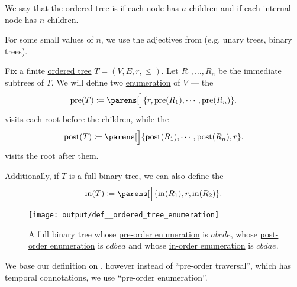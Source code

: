 \begin{definition}\label{def:n_ary_tree}
  We say that the \hyperref[def:ordered_tree]{ordered tree} is  if each node has  \( n \) children and  if each internal node has  \( n \) children.

  For some small values of \( n \), we use the adjectives from  (e.g. unary trees, binary trees).
\end{definition}

\begin{definition}\label{def:ordered_tree_enumeration}\mimprovised
  Fix a finite \hyperref[def:ordered_tree]{ordered tree} \( T = (V, E, r, \leq) \). Let \( R_1, \ldots, R_n \) be the immediate subtrees of \( T \). We will define two \hyperref[def:enumeration]{enumeration} of \( V \) --- the 
  \begin{equation}\label{eq:def:ordered_tree_enumeration/pre}
    \op{pre}(T) \coloneqq \parens[\Big]{ r, \op{pre}(R_1), \cdots, \op{pre}(R_n) }.
  \end{equation}
  visits each root before the children, while the 
  \begin{equation}\label{eq:def:ordered_tree_enumeration/post}
    \op{post}(T) \coloneqq \parens[\Big]{ \op{post}(R_1), \cdots, \op{post}(R_n), r }.
  \end{equation}
  visits the root after them.

  Additionally, if \( T \) is a \hyperref[def:n_ary_tree]{full binary tree}, we can also define the 
  \begin{equation}\label{eq:def:ordered_tree_enumeration/in}
    \op{in}(T) \coloneqq \parens[\Big]{ \op{in}(R_1), r, \op{in}(R_2) }.
  \end{equation}

  \begin{figure}[!ht]
    \centering
    \texttt{[image: output/def\_\_ordered\_tree\_enumeration]}
    \caption{A full binary tree whose \hyperref[eq:def:ordered_tree_enumeration/pre]{pre-order enumeration} is \( abcde \), whose \hyperref[eq:def:ordered_tree_enumeration/post]{post-order enumeration} is \( cdbea \) and whose \hyperref[eq:def:ordered_tree_enumeration/in]{in-order enumeration} is \( cbdae \).}
    \label{fig:def:ordered_tree_enumeration}
  \end{figure}
\end{definition}
\begin{comments}
  \item We base our definition on \cite[228]{Erickson2019Algorithms}, however instead of \enquote{pre-order traversal}, which has temporal connotations, we use \enquote{pre-order enumeration}.
\end{comments}

